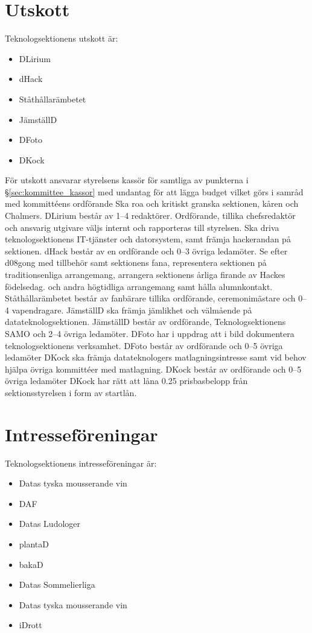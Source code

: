 \documentclass[a4paper]{dteklag}
\newcommand{\prisbasbelopp}[1]{
    #1 prisbasbelopp
    \ifdef{\nuvarandeprisbasbelopp}{
        \marginpar{
            \small{ \textbf{\roundandprint{\xintiexpr#1 * \nuvarandeprisbasbelopp\relax}kr}}
        }
    }{}
}
\begin{document}
\section{Utskott}
\para Teknologsektionens utskott är:
\begin{itemize}
  \item DLirium
  \item dHack
  \item Ståthållarämbetet
  \item JämställD
  \item DFoto
  \item DKock
\end{itemize}
\para För utskott ansvarar styrelsens kassör för samtliga av punkterna i \S\ref{sec:kommittee_kassor} med undantag för att lägga budget vilket görs i samråd med kommittéens ordförande
\para[DLirium] Ska roa och kritiskt granska sektionen, kåren och Chalmers.
\para DLirium består av 1–4 redaktörer. Ordförande, tillika chefsredaktör och ansvarig utgivare väljs internt och rapporteras till styrelsen.
\para[dHack] Ska driva teknologsektionens IT-tjänster och datorsystem, samt främja hackerandan på sektionen.
\para dHack består av en ordförande och 0–3 övriga ledamöter.
\para[Ståthållarämbetet] Se efter d08gong med tillbehör samt sektionens fana, representera sektionen på traditionsenliga arrangemang, arrangera sektionens årliga firande av Hackes födelsedag. och andra högtidliga arrangemang samt hålla alumnkontakt.
\para Ståthållarämbetet består av fanbärare tillika ordförande, ceremonimästare och 0–4 vapendragare.
\para[JämställD] JämställD ska främja jämlikhet och välmående på datateknologsektionen.
\para JämställD består av ordförande, Teknologsektionens SAMO och 2–4 övriga ledamöter.
\para[DFoto] DFoto har i uppdrag att i bild dokumentera teknologsektionens verksamhet.
\para DFoto består av ordförande och 0–5 övriga ledamöter
\para[DKock] DKock ska främja datateknologers matlagningsintresse samt vid behov hjälpa övriga kommittéer med matlagning.
\para DKock består av ordförande och 0–5 övriga ledamöter
\para DKock har rätt att låna \prisbasbelopp{0.25} från sektionsstyrelsen i form av startlån.
\section{Intresseföreningar}
Teknologsektionens intresseföreningar är:
\begin{itemize}
  \item Datas tyska mousserande vin
  \item DAF
  \item Datas Ludologer
  \item plantaD
  \item bakaD
  \item Datas Sommelierliga
  \item Datas tyska mousserande vin
  \item iDrott
\end{itemize}
\end{document}
